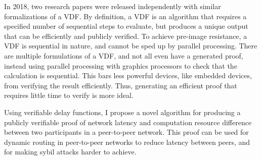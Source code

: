 In 2018, two research papers were released independently with similar formalizations of a VDF.\cite{wesolowski_efficient_2018}\cite{pietrzak_simple_2018} By definition, a VDF is an algorithm that requires a specified number of sequential steps to evaluate, but produces a unique output that can be efficiently and publicly verified.\cite{boneh_verifiable_2018} To achieve pre-image resistance, a VDF is sequential in nature, and cannot be sped up by parallel processing. There are multiple formulations of a VDF, and not all even have a generated proof, instead using parallel processing with graphics processors to check that the calculation is sequential.\cite{yakovenko_solana_nodate} This bars less powerful devices, like embedded devices, from verifying the result efficiently. Thus, generating an efficient proof that requires little time to verify is more ideal.\cite{boneh_verifiable_2018}

Using verifiable delay functions, I propose a novel algorithm for producing a publicly verifiable proof of network latency and computation resource difference between two participants in a peer-to-peer network. This proof can be used for dynamic routing in peer-to-peer networks to reduce latency between peers, and for making sybil attacks harder to achieve.
